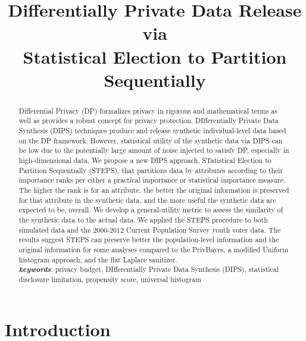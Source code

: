 \documentclass[12pt, A4]{article}
\theoremstyle{plain}
\theoremstyle{exampstyle}\newtheorem{defn}{Definition}
\theoremstyle{exampstyle}\newtheorem{lem}{Lemma}
\theoremstyle{exampstyle}\newtheorem{cor}{Corollary}
\theoremstyle{exampstyle}\newtheorem{pro}{Proposition}
\theoremstyle{exampstyle}\newtheorem{cla}{Claim}
\theoremstyle{exampstyle}\newtheorem{rem}{Remark}
\begin{document}
\title{\large{\textbf{Differentially Private Data Release via\\ Statistical Election to Partition Sequentially}}}

\date{}
\maketitle{}


\begin{abstract}
\noindent Differential Privacy (DP) formalizes privacy in rigorous and mathematical terms as well as provides a robust concept for privacy protection. DIfferentially Private Data Synthesis (DIPS) techniques produce and release synthetic individual-level data based on the DP framework. However, statistical utility of the synthetic data via DIPS can be low due to the potentially large amount of noise injected to satisfy DP, especially in high-dimensional data. We propose a new DIPS approach, STatistical Election to Partition Sequentially (STEPS), that partitions data by attributes according to their importance ranks per either a practical importance or statistical importance measure. The higher the rank is for an attribute, the better the original information is preserved for that attribute in the synthetic data, and the more useful the synthetic data are expected to be, overall. We develop a general-utility metric to assess the similarity of the synthetic data to the actual data. We applied the STEPS procedure to both simulated data and the 2000-2012 Current Population Survey youth voter data. The results suggest STEPS can preserve better the population-level information and the original information for some analyses compared to the PrivBayes, a modified Uniform histogram approach, and the flat Laplace sanitizer.\\

\noindent \textit{\textbf{keywords}}:  privacy budget, DIfferentially Private Data Synthesis (DIPS), statistical disclosure limitation, propensity score, universal histogram
\end{abstract}

\newpage
{}
\section{Introduction}\label{sec:intro}
\end{document}

